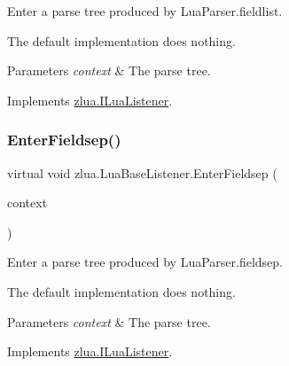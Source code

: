 Enter a parse tree produced by Lua\+Parser.\+fieldlist. 

The default implementation does nothing.


\begin{DoxyParams}{Parameters}
{\em context} & The parse tree.\\
\hline
\end{DoxyParams}


Implements \mbox{\hyperlink{interfacezlua_1_1_i_lua_listener_a52d5768d4a26b0d78da5e039713269cc}{zlua.\+I\+Lua\+Listener}}.

\mbox{\label{classzlua_1_1_lua_base_listener_a2f94f0a470d5c71b06cb6daa8873e069}} 
\subsubsection{\texorpdfstring{Enter\+Fieldsep()}{EnterFieldsep()}}
{\footnotesize\ttfamily virtual void zlua.\+Lua\+Base\+Listener.\+Enter\+Fieldsep (\begin{DoxyParamCaption}\item[{\mbox{[}\+Not\+Null\mbox{]} \mbox{\hyperlink{classzlua_1_1_lua_parser_1_1_fieldsep_context}{Lua\+Parser.\+Fieldsep\+Context}}}]{context }\end{DoxyParamCaption})\hspace{0.3cm}{\ttfamily [virtual]}}



Enter a parse tree produced by Lua\+Parser.\+fieldsep. 

The default implementation does nothing.


\begin{DoxyParams}{Parameters}
{\em context} & The parse tree.\\
\hline
\end{DoxyParams}


Implements \mbox{\hyperlink{interfacezlua_1_1_i_lua_listener_a9ee512ebb70fc9f3fe8bcc35b0e6efe4}{zlua.\+I\+Lua\+Listener}}.

\mbox{\label{classzlua_1_1_lua_base_listener_aeae8e0a0ca7fe9c5a24cb372585b81b7}} 
